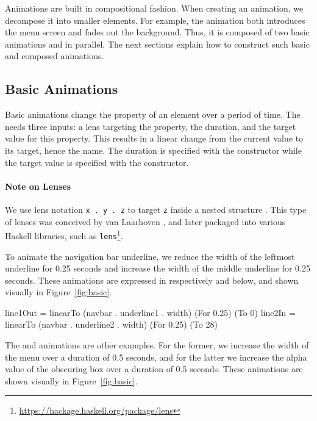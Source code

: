 Animations are built in compositional fashion. When creating an animation, we decompose it into smaller elements. For example, the  animation both introduces the menu screen and fades out the background. Thus, it is composed of two basic animations  and  in parallel. The next sections explain how to construct such basic and composed animations.

\subsection{Basic Animations}

Basic animations change the property of an element over a period of time. The
 needs three inputs: a lens targeting the property, the duration,
and the target value for this property. This results in a linear change from
the current value to its target, hence the name. The duration is specified
with the  constructor while the target value is specified with the
 constructor.

\paragraph{Note on Lenses} We use lens notation \texttt{x . y . z} to
target \texttt{z} inside a nested structure . This type of lenses was conceived by van Laarhoven
\cite{vlLenses}, and later packaged into
various Haskell libraries, such as
\texttt{lens}\footnote{\url{https://hackage.haskell.org/package/lens}}.

To animate the navigation bar underline, we reduce the width of the
leftmost underline for 0.25 seconds and increase the width of
the middle underline for 0.25 seconds. These animations are expressed in
respectively  and  below, and shown visually in
Figure~\ref{fig:basic}.

\begin{spec}
line1Out = linearTo (navbar . underline1 . width) (For 0.25) (To 0)
line2In = linearTo (navbar . underline2 . width) (For 0.25) (To 28)
\end{spec}

The  and  animations are other examples. For the
former, we increase the width of the menu over a duration of 0.5 seconds, and
for the latter we increase the alpha value of the obscuring box over a duration
of 0.5 seconds. These animations are shown visually in Figure~\ref{fig:basic}.


